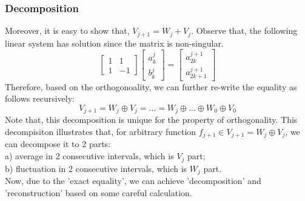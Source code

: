 \documentclass{article}
\begin{document}
\subsubsection{Decomposition}
Moreover, it is easy to show that, $V_{j+1} = W_j + V_j$. Observe that, the following linear system has solution since the matrix is non-singular.
\begin{equation}
	\left[
	\begin{array}{cc}
		1 & 1  \\
		1 & -1
	\end{array}
	\right]
	\left[
	\begin{array}{c}
		a^j_{k} \\ 
		b^j_{k} 
	\end{array}
	\right]
	=
		\left[
	\begin{array}{c}
		a^{j+1}_{2k} \\ 
		a^{j+1}_{2k+1} 
	\end{array}
	\right]
	\label{6}
\end{equation}
Therefore, based on the orthogonoality, we can further re-write the equality as follows recursively:
\begin{equation}
	V_{j+1} = W_j \oplus V_j = ...= W_j \oplus... \oplus W_0 \oplus V_0
\end{equation}
Note that, this decomposition is unique for the property of orthogonality. This decompisiton illustrates that, for arbitrary function $f_{j+1} \in V_{j+1}= W_j \oplus V_j $, we can decompose it to 2 parts: 
\vspace{4pt}
\\
a) average in 2 consecutive intervals, which is $V_j$ part;
\\
b) fluctuation in 2 consecutive intervals, which is $W_j$ part.
\vspace{4pt}
\\
Now, due to the 'exact equality', we can achieve 'decomposition' and 'reconstruction' based on some careful calculation. 
\end{document}
